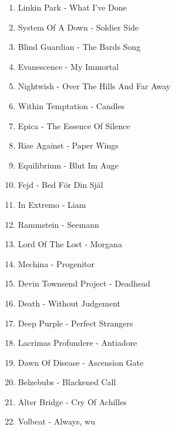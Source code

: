 \begin{enumerate}
	\item Linkin Park - What I've Done
	\item System Of A Down - Soldier Side
	\item Blind Guardian - The Bards Song
	\item Evanescence - My Immortal
	\item Nightwish - Over The Hills And Far Away
	\item Within Temptation - Candles
	\item Epica - The Essence Of Silence
	\item Rise Against - Paper Wings
	\item Equilibrium - Blut Im Auge
	\item Fejd - Bed För Din Själ 		
	\item In Extremo - Liam
	\item Rammstein - Seemann
	\item Lord Of The Lost - Morgana
	\item Mechina - Progenitor
	\item Devin Townsend Project - Deadhead 
	\item Death - Without Judgement
	\item Deep Purple - Perfect Strangers
	\item Lacrimas Profundere - Antiadore
	\item Dawn Of Disease - Ascension Gate
	\item Belzebubs - Blackened Call
	\item Alter Bridge - Cry Of Achilles
	\item Volbeat - Always, wu
\end{enumerate}
